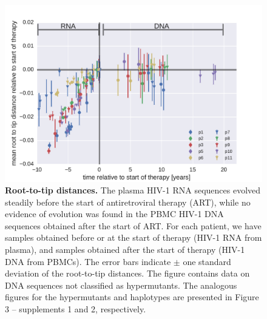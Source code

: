 \documentclass[aps,rmp,onecolumn,linenumbers]{revtex4-1}
\begin{document}
\begin{figure}[tb]
\centering
\includegraphics[width=0.7\columnwidth]{figures/fig3}
\caption{{\bf Root-to-tip distances.} The plasma HIV-1 RNA sequences evolved steadily before the start of antiretroviral therapy (ART), while no evidence of evolution was found in the PBMC HIV-1 DNA sequences obtained after the start of ART. For each patient, we have samples obtained before or at the start of therapy (HIV-1 RNA from plasma), and samples obtained after the start of therapy (HIV-1 DNA from PBMCs). The error bars indicate $\pm$ one standard deviation of the root-to-tip distances. The figure contains data on DNA sequences not classified as hypermutants. The analogous figures for the hypermutants and haplotypes are presented in Figure 3 -- supplements 1 and 2, respectively.}
\label{fig:root_to_tip}
\end{figure}
\end{document}
